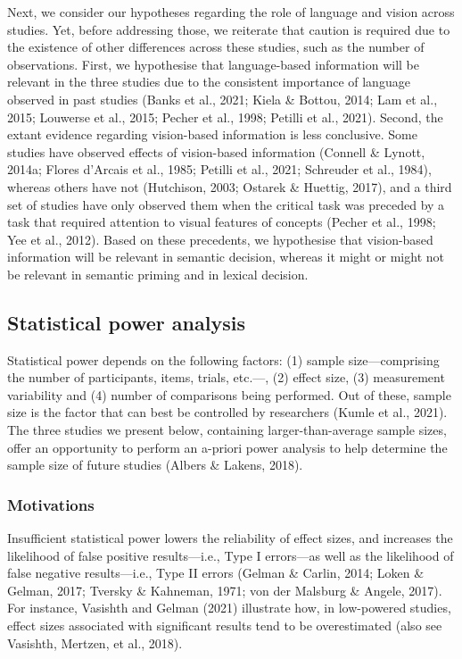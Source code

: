\documentclass[
  12pt,
  man,floatsintext]{apa7}
\begin{document}
Next, we consider our hypotheses regarding the role of language and vision across studies. Yet, before addressing those, we reiterate that caution is required due to the existence of other differences across these studies, such as the number of observations. First, we hypothesise that language-based information will be relevant in the three studies due to the consistent importance of language observed in past studies (Banks et al., 2021; Kiela \& Bottou, 2014; Lam et al., 2015; Louwerse et al., 2015; Pecher et al., 1998; Petilli et al., 2021). Second, the extant evidence regarding vision-based information is less conclusive. Some studies have observed effects of vision-based information (Connell \& Lynott, 2014a; Flores d'Arcais et al., 1985; Petilli et al., 2021; Schreuder et al., 1984), whereas others have not (Hutchison, 2003; Ostarek \& Huettig, 2017), and a third set of studies have only observed them when the critical task was preceded by a task that required attention to visual features of concepts (Pecher et al., 1998; Yee et al., 2012). Based on these precedents, we hypothesise that vision-based information will be relevant in semantic decision, whereas it might or might not be relevant in semantic priming and in lexical decision.

\hypertarget{statistical-power-analysis}{%
\subsection{Statistical power analysis}\label{statistical-power-analysis}}

Statistical power depends on the following factors: (1) sample size---comprising the number of participants, items, trials, etc.---, (2) effect size, (3) measurement variability and (4) number of comparisons being performed. Out of these, sample size is the factor that can best be controlled by researchers (Kumle et al., 2021). The three studies we present below, containing larger-than-average sample sizes, offer an opportunity to perform an a-priori power analysis to help determine the sample size of future studies (Albers \& Lakens, 2018).

\hypertarget{motivations}{%
\subsubsection{Motivations}\label{motivations}}

Insufficient statistical power lowers the reliability of effect sizes, and increases the likelihood of false positive results---i.e., Type I errors---as well as the likelihood of false negative results---i.e., Type II errors (Gelman \& Carlin, 2014; Loken \& Gelman, 2017; Tversky \& Kahneman, 1971; von der Malsburg \& Angele, 2017). For instance, Vasishth and Gelman (2021) illustrate how, in low-powered studies, effect sizes associated with significant results tend to be overestimated (also see Vasishth, Mertzen, et al., 2018).
\end{document}
